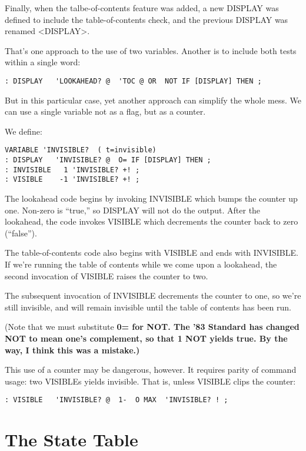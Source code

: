 Finally, when the talbe-of-contents feature was added, a new DISPLAY
was defined to include the table-of-contents check, and the
previous DISPLAY was renamed <DISPLAY>.

That's one approach to the use of two variables. Another is to include
both tests within a single word:

\begin{verbatim}
: DISPLAY   'LOOKAHEAD? @  'TOC @ OR  NOT IF [DISPLAY] THEN ;
\end{verbatim}

But in this particular case, yet another approach can simplify the whole
mess. We can use a single variable not as a flag, but as a counter.

We define:

\begin{verbatim}
VARIABLE 'INVISIBLE?  ( t=invisible)
: DISPLAY   'INVISIBLE? @  O= IF [DISPLAY] THEN ;
: INVISIBLE   1 'INVISIBLE? +! ;
: VISIBLE    -1 'INVISIBLE? +! ;
\end{verbatim}

The lookahead code begins by invoking INVISIBLE which bumps the
counter up one. Non-zero is ``true,'' so DISPLAY will not do the output.
After the lookahead, the code invokes VISIBLE which decrements the
counter back to zero (``false'').

The table-of-contents code also begins with VISIBLE and ends with
INVISIBLE. If we're running the table of contents while we come upon a
lookahead, the second invocation of VISIBLE raises the counter to two.

The subsequent invocation of INVISIBLE decrements the counter to
one, so we're still invisible, and will remain invisible until the table of
contents has been run.

(Note that we must substitute \bf{0=} for \bf{NOT}. The '83 Standard has
changed \bf{NOT} to mean one's complement, so that \bf{1 NOT} yields true. By
the way, I think this was a mistake.)

This use of a counter may be dangerous, however. It requires parity
of command usage: two VISIBLEs yields invisible. That is, unless VISIBLE
clips the counter:

\begin{verbatim}
: VISIBLE   'INVISIBLE? @  1-  O MAX  'INVISIBLE? ! ;
\end{verbatim}

\section{The State Table}

